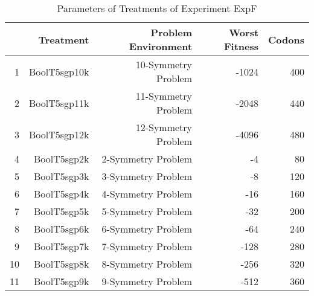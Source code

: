 \begin{table}[ht]
\centering
\begin{tabular}{rrrrr}
  \hline
 & Treatment & Problem Environment & Worst Fitness & Codons \\ 
  \hline
1 & BoolT5sgp10k & 10-Symmetry Problem & -1024 & 400 \\ 
  2 & BoolT5sgp11k & 11-Symmetry Problem & -2048 & 440 \\ 
  3 & BoolT5sgp12k & 12-Symmetry Problem & -4096 & 480 \\ 
  4 & BoolT5sgp2k & 2-Symmetry Problem &    -4 &  80 \\ 
  5 & BoolT5sgp3k & 3-Symmetry Problem &    -8 & 120 \\ 
  6 & BoolT5sgp4k & 4-Symmetry Problem &   -16 & 160 \\ 
  7 & BoolT5sgp5k & 5-Symmetry Problem &   -32 & 200 \\ 
  8 & BoolT5sgp6k & 6-Symmetry Problem &   -64 & 240 \\ 
  9 & BoolT5sgp7k & 7-Symmetry Problem &  -128 & 280 \\ 
  10 & BoolT5sgp8k & 8-Symmetry Problem &  -256 & 320 \\ 
  11 & BoolT5sgp9k & 9-Symmetry Problem &  -512 & 360 \\ 
   \hline
\end{tabular}
\caption{Parameters of Treatments of Experiment ExpF} 
\end{table}
